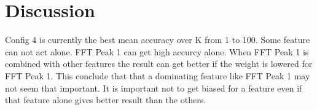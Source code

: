 \section{Discussion}
Config 4 is currently the best mean accuracy over K from 1 to 100.
Some feature can not act alone. FFT Peak 1 can get high accurcy alone. When FFT Peak 1 is combined with other features the result can get better if the weight is lowered for FFT Peak 1. This conclude that that a dominating feature like FFT Peak 1 may not seem that important. It is important not to get biased for a feature even if that feature alone gives better result than the others.
